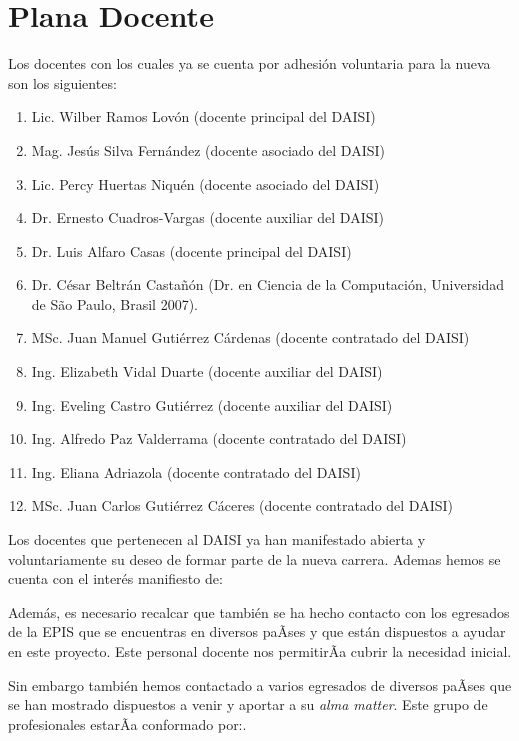 \section{Plana Docente}\label{sec:staff}
Los docentes con los cuales ya se cuenta por adhesión voluntaria para la nueva \SchoolFullName son los siguientes:

\begin{enumerate}
\item Lic. Wilber Ramos Lovón (docente principal del DAISI)
\item Mag. Jesús Silva Fernández (docente asociado del DAISI)
\item Lic. Percy Huertas Niquén (docente asociado del DAISI)
\item Dr.  Ernesto Cuadros-Vargas (docente auxiliar del DAISI)
\item Dr.  Luis Alfaro Casas (docente principal del DAISI)
\item Dr. César Beltrán Castañón (Dr. en Ciencia de la Computación, Universidad de S\~ao Paulo, Brasil 2007).
\item MSc. Juan Manuel Gutiérrez Cárdenas (docente contratado del DAISI)
\item Ing. Elizabeth Vidal Duarte (docente auxiliar del DAISI)
\item Ing. Eveling Castro Gutiérrez (docente auxiliar del DAISI)
\item Ing. Alfredo Paz Valderrama (docente contratado del DAISI)
\item Ing. Eliana Adriazola (docente contratado del DAISI)
\item MSc. Juan Carlos Gutiérrez Cáceres (docente contratado del DAISI)
\end{enumerate}

Los docentes que pertenecen al DAISI ya han manifestado abierta y voluntariamente su deseo de formar parte de la nueva carrera. Ademas hemos se cuenta con el interés manifiesto de:

\begin{enumerate}
\end{enumerate}

Además, es necesario recalcar que también se ha hecho contacto con los egresados de la EPIS que se encuentras en diversos paÃ­ses y que están dispuestos a ayudar en este proyecto. Este personal docente nos permitirÃ­a cubrir la necesidad inicial.

Sin embargo también hemos contactado a varios egresados de diversos paÃ­ses que se han mostrado dispuestos a venir y aportar a su \textit{alma matter}. Este grupo de profesionales estarÃ­a conformado por:.

